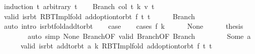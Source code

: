 \begin{isabellebody}
%
\isadelimproof
%
\endisadelimproof
%
\isatagproof
{}\isamarkupfalse%
\ {\isacharparenleft}{\kern0pt}induction\ t\ arbitrary{\isacharcolon}{\kern0pt}\ t{\isacharprime}{\kern0pt}{\isacharparenright}{\kern0pt}\isanewline
\ \ \isamarkupfalse%
\ {\isacharparenleft}{\kern0pt}Branch\ col\ t{}\ k\ v\ t{}{\isacharparenright}{\kern0pt}\isanewline
\ \ \isamarkupfalse%
\ valid{\isacharcolon}{\kern0pt}\ {\isachardoublequoteopen}is{\isacharunderscore}{\kern0pt}rbt\ {\isacharparenleft}{\kern0pt}RBT{\isacharunderscore}{\kern0pt}Impl{\isachardot}{\kern0pt}fold\ {\isacharparenleft}{\kern0pt}add{\isacharunderscore}{\kern0pt}option{\isacharunderscore}{\kern0pt}to{\isacharunderscore}{\kern0pt}rbt\ f{\isacharparenright}{\kern0pt}\ t{}\ t{\isacharprime}{\kern0pt}{\isacharparenright}{\kern0pt}{\isachardoublequoteclose}\isanewline
\ \ \ \ \isamarkupfalse%
\ Branch{\isacharparenleft}{\kern0pt}{}{\isacharparenright}{\kern0pt}\isanewline
\ \ \ \ \isamarkupfalse%
\ {\isacharparenleft}{\kern0pt}auto\ intro{\isacharcolon}{\kern0pt}\ is{\isacharunderscore}{\kern0pt}rbt{\isacharunderscore}{\kern0pt}fold{\isacharunderscore}{\kern0pt}add{\isacharunderscore}{\kern0pt}to{\isacharunderscore}{\kern0pt}rbt{\isacharparenright}{\kern0pt}\isanewline
\ \ \isamarkupfalse%
\ {\isacharquery}{\kern0pt}case\isanewline
\ \ \isamarkupfalse%
\ {\isacharparenleft}{\kern0pt}cases\ {\isachardoublequoteopen}f\ k{\isachardoublequoteclose}{\isacharparenright}{\kern0pt}\isanewline
\ \ \ \ \isamarkupfalse%
\ None\isanewline
\ \ \ \ \isamarkupfalse%
\ {\isacharquery}{\kern0pt}thesis\isanewline
\ \ \ \ \ \ \isamarkupfalse%
\ {\isacharparenleft}{\kern0pt}auto\ simp{\isacharcolon}{\kern0pt}\ None\ Branch{\isacharparenleft}{\kern0pt}{}{\isacharparenright}{\kern0pt}{\isacharbrackleft}{\kern0pt}OF\ valid{\isacharbrackright}{\kern0pt}\ Branch{\isacharparenleft}{\kern0pt}{}{\isacharparenright}{\kern0pt}{\isacharbrackleft}{\kern0pt}OF\ Branch{\isacharparenleft}{\kern0pt}{}{\isacharparenright}{\kern0pt}{\isacharbrackright}{\kern0pt}{\isacharparenright}{\kern0pt}\isanewline
\ \ \isamarkupfalse%
\isanewline
\ \ \ \ \isamarkupfalse%
\ {\isacharparenleft}{\kern0pt}Some\ a{\isacharparenright}{\kern0pt}\isanewline
\ \ \ \ \isamarkupfalse%
\ valid{\isacharprime}{\kern0pt}{\isacharcolon}{\kern0pt}\ {\isachardoublequoteopen}is{\isacharunderscore}{\kern0pt}rbt\ {\isacharparenleft}{\kern0pt}add{\isacharunderscore}{\kern0pt}to{\isacharunderscore}{\kern0pt}rbt\ {\isacharparenleft}{\kern0pt}a{\isacharcomma}{\kern0pt}\ k{\isacharparenright}{\kern0pt}\ {\isacharparenleft}{\kern0pt}RBT{\isacharunderscore}{\kern0pt}Impl{\isachardot}{\kern0pt}fold\ {\isacharparenleft}{\kern0pt}add{\isacharunderscore}{\kern0pt}option{\isacharunderscore}{\kern0pt}to{\isacharunderscore}{\kern0pt}rbt\ f{\isacharparenright}{\kern0pt}\ t{}\ t{\isacharprime}{\kern0pt}{\isacharparenright}{\kern0pt}{\isacharparenright}{\kern0pt}{\isachardoublequoteclose}\isanewline

\end{isabellebody}
